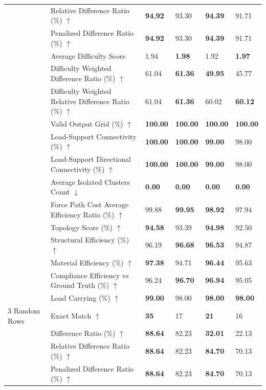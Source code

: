 \begin{table}[!h]
{\begin{tabular}{llll|ll}
 & Relative Difference Ratio (\%) $\uparrow$ & \textbf{94.92} & 93.30 & \textbf{94.39} & 91.71 \\
 & Penalized Difference Ratio (\%) $\uparrow$ & \textbf{94.92} & 93.30 & \textbf{94.39} & 91.71 \\
 & Average Difficulty Score & 1.94 & \textbf{1.98} & 1.92 & \textbf{1.97} \\
 & Difficulty Weighted Difference Ratio (\%) $\uparrow$ & 61.04 & \textbf{61.36} & \textbf{49.95} & 45.77 \\
 & Difficulty Weighted Relative Difference Ratio (\%) $\uparrow$ & 61.04 & \textbf{61.36} & 60.02 & \textbf{60.12} \\
 & Valid Output Grid (\%) $\uparrow$ & \textbf{100.00} & \textbf{100.00} & \textbf{100.00} & \textbf{100.00} \\
 & Load-Support Connectivity (\%) $\uparrow$ & \textbf{100.00} & \textbf{100.00} & \textbf{99.00} & 98.00 \\
 & Load-Support Directional Connectivity (\%) $\uparrow$ & \textbf{100.00} & \textbf{100.00} & \textbf{99.00} & 98.00 \\
 & Average Isolated Clusters Count $\downarrow$ & \textbf{0.00} & \textbf{0.00} & \textbf{0.00} & \textbf{0.00} \\
 & Force Path Cost Average Efficiency Ratio (\%) $\uparrow$ & 99.88 & \textbf{99.95} & \textbf{98.92} & 97.94 \\
 & Topology Score (\%) $\uparrow$ & \textbf{94.58} & 93.39 & \textbf{94.98} & 92.50 \\
 & Structural Efficiency (\%) $\uparrow$ & 96.19 & \textbf{96.68} & \textbf{96.53} & 94.87 \\
 & Material Efficiency (\%) $\uparrow$ & \textbf{97.38} & 94.71 & \textbf{96.44} & 95.63 \\
 & Compliance Efficiency vs Ground Truth (\%) $\uparrow$ & 96.24 & \textbf{96.70} & \textbf{96.94} & 95.05 \\
 & Load Carrying (\%) $\uparrow$ & \textbf{99.00} & 98.00 & \textbf{98.00} & \textbf{98.00} \\
\midrule
3 Random Rows & Exact Match $\uparrow$ & \textbf{35} & 17 & \textbf{21} & 16 \\
 & Difference Ratio (\%) $\uparrow$ & \textbf{88.64} & 82.23 & \textbf{32.01} & 22.13 \\
 & Relative Difference Ratio (\%) $\uparrow$ & \textbf{88.64} & 82.23 & \textbf{84.70} & 70.13 \\
 & Penalized Difference Ratio (\%) $\uparrow$ & \textbf{88.64} & 82.23 & \textbf{84.70} & 70.13 \\

\end{tabular}}
\end{table}
